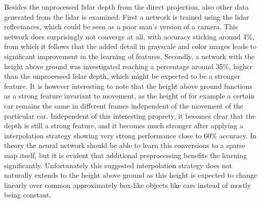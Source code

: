

Besides the unprocessed lidar depth from the direct projection, also other data generated from the lidar is examined. First a network is trained using the lidar reflectances, which could be seen as a poor man's version of a camera. This network does surprisingly not converge at all, with accuracy sticking around 4\%, from which it follows that the added detail in grayscale and color images leads to significant improvement in the learning of features. Secondly, a network with the height above ground was investigated reaching a percentage around 35\%, higher than the unprocessed lidar depth, which might be expected to be a stronger feature. It is however interesting to note that the height above ground functions as a strong feature invariant to movement, as the height of for example a certain car remains the same in different frames independent of the movement of the particular car. Independent of this interesting proprety, it becomes clear that the depth is still a strong feature, and it becomes much stronger after applying a interpolation strategy showing very strong performance close to 60\% accuracy. In theory the neural network should be able to learn this conversions to a sparse map itself, but it is evident that additional preprocessing benefits the learning significantly. Unfortunately this suggested interpolation strategy does not naturally extends to the height above ground as this height is expected to change linearly over common approximately box-like objects like cars instead of mostly being constant. 


